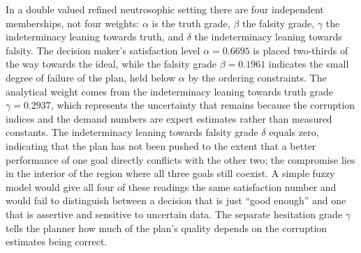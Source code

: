 \documentclass[a4paper]{elsarticle}
\begin{document}
{In a double valued refined neutrosophic setting there are four independent memberships, not four weights: $\alpha$ is the truth grade, $\beta$ the falsity grade, $\gamma$ the indeterminacy leaning towards truth, and $\delta$ the indeterminacy leaning towards falsity. The decision maker's satisfaction level $\alpha = 0.6695$ is placed two-thirds of the way towards the ideal, while the falsity grade $\beta= 0.1961$ indicates the small degree of failure of the plan, held below $\alpha$ by the ordering constraints. The analytical weight comes from the indeterminacy leaning towards truth grade $\gamma = 0.2937$, which represents the uncertainty that remains because the corruption indices and the demand numbers are expert estimates rather than measured constants. The indeterminacy leaning towards falsity grade $\delta$ equals zero, indicating that the plan has not been pushed to the extent that a better performance of one goal directly conflicts with the other two; the compromise lies in the interior of the region where all three goals still coexist. A simple fuzzy model would give all four of these readings the same satisfaction number and would fail to distinguish between a decision that is just ``good enough'' and one that is assertive and sensitive to uncertain data. The separate hesitation grade $\gamma$ tells the planner how much of the plan's quality depends on the corruption estimates being correct.\\
}
\end{document}
